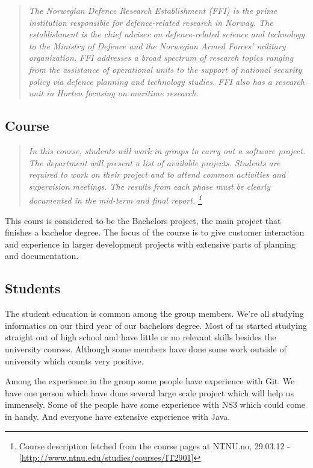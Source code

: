     \begin{quotation}
    \em The Norwegian Defence Research Establishment (FFI) is the prime institution responsible for defence-related research in Norway. The establishment is the chief adviser on defence-related science and technology to the Ministry of Defence and the Norwegian Armed Forces’ military organization. FFI addresses a broad spectrum of research topics ranging from the assistance of operational units to the support of national security policy via defence planning and technology studies. FFI also has a research unit in Horten focusing on maritime research.
    \end{quotation}
    
    \subsection{Course}\label{Course}
    \begin{quotation}
    \em In this course, students will work in groups to carry out a software project. The department will present a list of available projects. Students are required to work on their project and to attend common activities and supervision meetings. The results from each phase must be clearly documented in the mid-term and final report.
    \footnote{Course description fetched from the course pages at NTNU.no, 29.03.12 - [\url{http://www.ntnu.edu/studies/courses/IT2901}]}
    \end{quotation}
    
    This cours is considered to be the Bachelors project, the main project that finishes a bachelor degree. The focus of the course is to give customer interaction and experience in larger development projects with extensive parts of planning and documentation. 
    
    
    \subsection{Students}\label{Students}

    The student education is common among the group members. We're all studying informatics on our third year of our bachelors degree. Most of us started studying straight out of high school and have little or no relevant skills besides the university courses. Although some members have done some work outside of university which counts very positive. 
    
    Among the experience in the group some people have experience with Git. We have one person which have done several large scale project which will help us immensely. Some of the people have some experience with NS3 which could come in handy. And everyone have extensive experience with Java.
    
